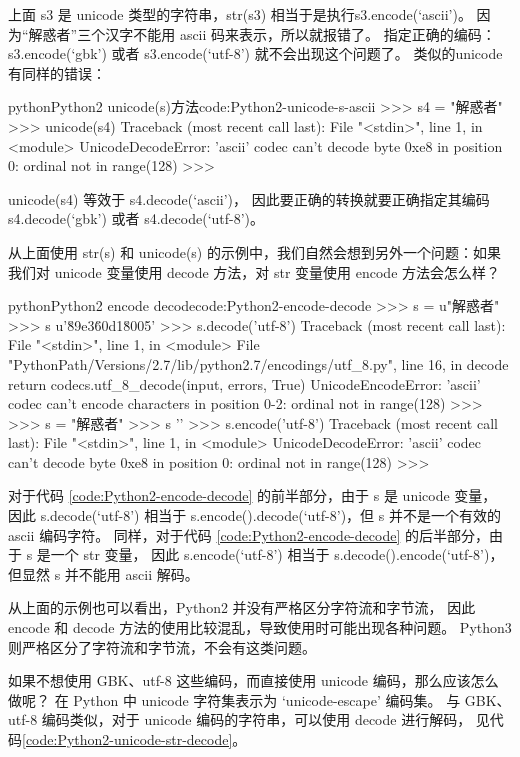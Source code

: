 上面 s3 是 unicode 类型的字符串，str(s3) 相当于是执行s3.encode(`ascii')。
因为“解惑者”三个汉字不能用 ascii 码来表示，所以就报错了。
指定正确的编码：s3.encode(`gbk') 或者 s3.encode(`utf-8') 就不会出现这个问题了。
类似的unicode有同样的错误：
\begin{jcode}{python}{Python2 unicode(s)方法}{code:Python2-unicode-s-ascii}
>>> s4 = "解惑者"
>>> unicode(s4)
Traceback (most recent call last):
  File "<stdin>", line 1, in <module>
UnicodeDecodeError: 'ascii' codec can't decode byte 0xe8 in position 0:
ordinal not in range(128)
>>>
\end{jcode}

unicode(s4) 等效于 s4.decode(`ascii')，
因此要正确的转换就要正确指定其编码 s4.decode(`gbk') 或者 s4.decode(`utf-8')。

从上面使用 str(s) 和 unicode(s) 的示例中，我们自然会想到另外一个问题：如果我们对
unicode 变量使用 decode 方法，对 str 变量使用 encode 方法会怎么样？

\begin{jcode}{python}{Python2 encode decode}{code:Python2-encode-decode}
>>> s = u"解惑者"
>>> s
u'\u89e3\u60d1\u8005'
>>> s.decode('utf-8')
Traceback (most recent call last):
  File "<stdin>", line 1, in <module>
  File "PythonPath/Versions/2.7/lib/python2.7/encodings/utf_8.py", line 16, in decode
    return codecs.utf_8_decode(input, errors, True)
UnicodeEncodeError: 'ascii' codec can't encode characters in position 0-2:
ordinal not in range(128)
>>>
>>> s = "解惑者"
>>> s
''
>>> s.encode('utf-8')
Traceback (most recent call last):
  File "<stdin>", line 1, in <module>
UnicodeDecodeError: 'ascii' codec can't decode byte 0xe8 in position 0:
ordinal not in range(128)
>>>
\end{jcode}

对于代码 \ref{code:Python2-encode-decode} 的前半部分，由于 s 是 unicode 变量，
因此 s.decode(`utf-8') 相当于 s.encode().decode(`utf-8')，但 s 并不是一个有效的 ascii 编码字符。
同样，对于代码 \ref{code:Python2-encode-decode} 的后半部分，由于 s 是一个 str 变量，
因此 s.encode(`utf-8') 相当于 s.decode().encode(`utf-8')，但显然 s 并不能用 ascii 解码。

从上面的示例也可以看出，Python2 并没有严格区分字符流和字节流，
因此 encode 和 decode 方法的使用比较混乱，导致使用时可能出现各种问题。
Python3 则严格区分了字符流和字节流，不会有这类问题。

如果不想使用 GBK、utf-8 这些编码，而直接使用 unicode 编码，那么应该怎么做呢？
在 Python 中 unicode 字符集表示为 `unicode-escape' 编码集。
与 GBK、utf-8 编码类似，对于 unicode 编码的字符串，可以使用 decode 进行解码，
见代码\ref{code:Python2-unicode-str-decode}。

